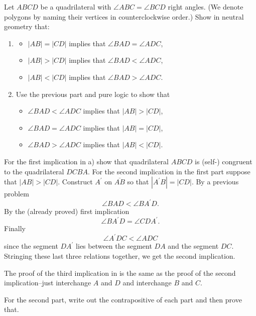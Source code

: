 \documentclass[instructornotes]{ximera}
\begin{document}
\begin{problem}
  Let $ABCD$ be a quadrilateral with $\angle ABC=\angle BCD$ right
  angles. (We denote polygons by naming their vertices in
  counterclockwise order.) Show in neutral geometry that:
  \begin{enumerate}
  \item \begin{itemize}
  \item $\left\vert AB\right\vert =\left\vert CD\right\vert $
    implies that $\angle BAD=\angle ADC$,
  \item $\left\vert AB\right\vert >\left\vert CD\right\vert $
    implies that $\angle BAD<\angle ADC$,
    \item $\left\vert AB\right\vert <\left\vert CD\right\vert $
      implies that $\angle BAD>\angle ADC$.
  \end{itemize}
  \item Use the previous part and pure logic to show that
    \begin{itemize}
    \item $\angle BAD<\angle ADC$ implies that $\left\vert
      AB\right\vert >\left\vert CD\right\vert $,
    \item $\angle BAD=\angle ADC$ implies that $\left\vert
      AB\right\vert =\left\vert CD\right\vert $,
    \item $\angle BAD>\angle ADC$ implies that $\left\vert
      AB\right\vert <\left\vert CD\right\vert $.
    \end{itemize}
  \end{enumerate}
\begin{hint} For the first implication in a) show that quadrilateral $ABCD$ is
(self-) congruent to the quadrilateral $DCBA$.  For the second
  implication in the first part suppose that $\left\vert AB\right\vert
  >\left\vert CD\right\vert $.  Construct $A^{\prime}$ on
  $\overline{AB}$ so that $\left\vert A^{\prime}B\right\vert
  =\left\vert CD\right\vert $. By a previous problem
\[
\angle BAD<\angle BA^{\prime}D.
\]
By the (already proved) first implication%
\[
\angle BA^{\prime}D=\angle CDA^{\prime}.
\]
Finally%
\[
\angle A^{\prime}DC<\angle ADC
\]
since the segment $DA^{\prime}$ lies between the segment $DA$ and the segment
$DC$. Stringing these last three relations together, we get the second
implication.

The proof of the third implication in is the same as the proof of the
second implication--just interchange $A$ and $D$ and interchange $B$
and $C$.

For the second part, write out the contrapositive of each part and then prove
that.
\end{hint}
\end{problem}
\end{document}
